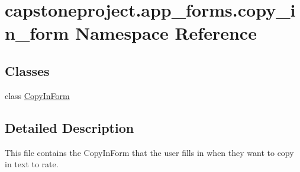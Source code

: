 \hypertarget{namespacecapstoneproject_1_1app__forms_1_1copy__in__form}{}\section{capstoneproject.\+app\+\_\+forms.\+copy\+\_\+in\+\_\+form Namespace Reference}
\label{namespacecapstoneproject_1_1app__forms_1_1copy__in__form}
\subsection*{Classes}
\begin{DoxyCompactItemize}
\item 
class \mbox{\hyperlink{classcapstoneproject_1_1app__forms_1_1copy__in__form_1_1_copy_in_form}{Copy\+In\+Form}}
\end{DoxyCompactItemize}


\subsection{Detailed Description}
\begin{DoxyVerb}This file contains the CopyInForm that the user fills in when they want to copy in text to rate.
\end{DoxyVerb}
 